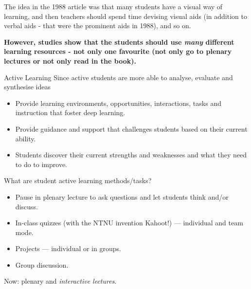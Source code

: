 \documentclass[
  ignorenonframetext,
]{beamer}
\providecommand{\tightlist}{%
  \setlength{\itemsep}{0pt}\setlength{\parskip}{0pt}}
\begin{document}
\begin{frame}
The idea in the 1988 article was that many students have a visual way of
learning, and then teachers should spend time devising visual aids (in
addition to verbal aids - that were the prominent aids in 1988), and so
on.

\textbf{However, studies show that the students should use \emph{many}
different learning resources - not only one favourite (not only go to
plenary lectures or not only read in the book).}
\end{frame}

\begin{frame}{Active Learning}
\label{active-learning}
Since active students are more able to analyse, evaluate and synthesise
ideas

\begin{itemize}
\tightlist
\item
  Provide learning environments, opportunities, interactions, tasks and
  instruction that foster deep learning.
\item
  Provide guidance and support that challenges students based on their
  current ability.
\item
  Students discover their current strengths and weaknesses and what they
  need to do to improve.
\end{itemize}

What are student active learning methods/tasks?

\begin{itemize}
\tightlist
\item
  Pause in plenary lecture to ask questions and let students think
  and/or discuss.
\item
  In-class quizzes (with the NTNU invention Kahoot!) --- individual and
  team mode.
\item
  Projects --- individual or in groups.
\item
  Group discussion.
\end{itemize}

Now: plenary and \emph{interactive lectures}.
\end{frame}
\end{document}
